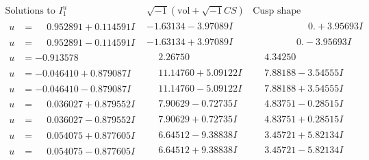 \documentclass[1p]{elsarticle_modified}
\theoremstyle{definition}
\newcommand{\I}{\sqrt{-1}}
\begin{document}
$$\begin{array}{c|c|c}  
\text{Solutions to }I^u_{1}& \I (\text{vol} + \sqrt{-1}CS) & \text{Cusp shape}\\
 \hline 
\begin{aligned}
u &= \phantom{-}0.952891 + 0.114591 I\end{aligned}
 & -1.63134 - 3.97089 I & \phantom{-0.000000 -}0. + 3.95693 I \\ \hline\begin{aligned}
u &= \phantom{-}0.952891 - 0.114591 I\end{aligned}
 & -1.63134 + 3.97089 I & \phantom{-0.000000 } 0. - 3.95693 I \\ \hline\begin{aligned}
u &= -0.913578\phantom{ +0.000000I}\end{aligned}
 & \phantom{-}2.26750\phantom{ +0.000000I} & \phantom{-}4.34250\phantom{ +0.000000I} \\ \hline\begin{aligned}
u &= -0.046410 + 0.879087 I\end{aligned}
 & \phantom{-}11.14760 + 5.09122 I & \phantom{-}7.88188 - 3.54555 I \\ \hline\begin{aligned}
u &= -0.046410 - 0.879087 I\end{aligned}
 & \phantom{-}11.14760 - 5.09122 I & \phantom{-}7.88188 + 3.54555 I \\ \hline\begin{aligned}
u &= \phantom{-}0.036027 + 0.879552 I\end{aligned}
 & \phantom{-}7.90629 - 0.72735 I & \phantom{-}4.83751 - 0.28515 I \\ \hline\begin{aligned}
u &= \phantom{-}0.036027 - 0.879552 I\end{aligned}
 & \phantom{-}7.90629 + 0.72735 I & \phantom{-}4.83751 + 0.28515 I \\ \hline\begin{aligned}
u &= \phantom{-}0.054075 + 0.877605 I\end{aligned}
 & \phantom{-}6.64512 - 9.38838 I & \phantom{-}3.45721 + 5.82134 I \\ \hline\begin{aligned}
u &= \phantom{-}0.054075 - 0.877605 I\end{aligned}
 & \phantom{-}6.64512 + 9.38838 I & \phantom{-}3.45721 - 5.82134 I \\ \hline\begin{aligned}

\end{aligned}
\end{array}$$
\end{document}
